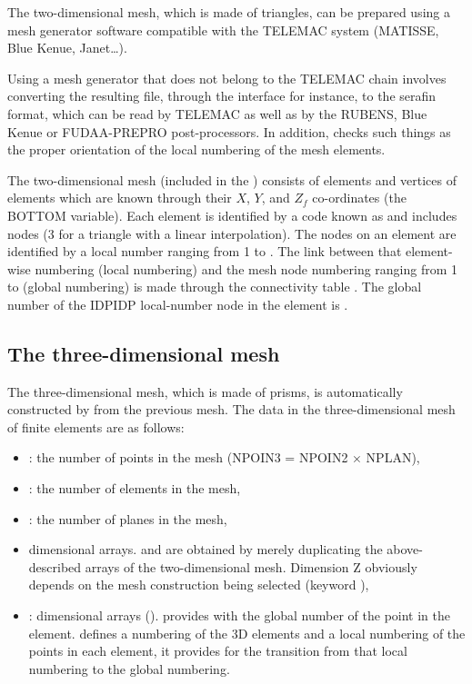 The two-dimensional mesh, which is made of triangles, can be prepared using a
mesh generator software compatible with the TELEMAC system (MATISSE,
Blue Kenue, Janet\dots).

Using a mesh generator that does not belong to the TELEMAC chain involves
converting the resulting file, through the \stbtel interface for instance, to
the serafin format, which can be read by TELEMAC as well as by the RUBENS, Blue
Kenue or FUDAA-PREPRO post-processors. In addition, \stbtel checks such
things as the proper orientation of the local numbering of the mesh elements.

The two-dimensional mesh (included in the ) consists of
 elements and  vertices of elements which are
known through their $X$, $Y$, and $Z_{f}$ co-ordinates (the BOTTOM
variable). Each element is identified by a code known as  and
includes  nodes (3 for a triangle with a linear interpolation).
The nodes on an element are identified by a local number ranging from 1 to
. The link between that element-wise numbering (local numbering)
and the mesh node numbering ranging from 1 to  (global numbering)
is made through the connectivity table .
The global number of the IDPIDP local-number node in the  element
is .


\subsection{The three-dimensional mesh}

The three-dimensional mesh, which is made of prisms, is automatically
constructed by  from the previous mesh. The data in the
three-dimensional mesh of finite elements are as follows:

\begin{itemize}
\item {}: the number of points in the mesh (NPOIN3 = NPOIN2 $\times$
NPLAN),
\item {}: the number of elements in the mesh,
\item {}: the number of planes in the mesh,
\item {} dimensional arrays.  and 
are obtained by merely duplicating the above-described arrays of the two-dimensional
mesh. Dimension Z obviously depends on the mesh construction being selected
(keyword ),
\item {}: dimensional arrays ().
 provides with the global number of the  point
in the  element.  defines a numbering
of the 3D elements and a local numbering of the points in each element, it
provides for the transition from that local numbering to the global numbering.
\end{itemize}

